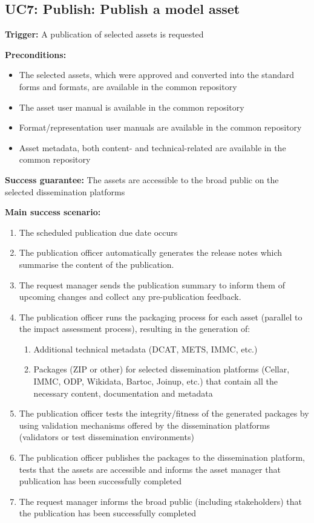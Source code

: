 	\subsection{UC7: Publish: Publish a model asset}
	\label{sec:uc7}
		
	\textbf{Trigger:} A publication of selected assets is requested
	
	\textbf{Preconditions:} 
	\begin{itemize}
		\item The selected assets, which were approved and converted into the standard forms and formats, are available in the common repository
		\item The asset user manual is available in the common repository
		\item Format/representation user manuals are available in the common repository
		\item Asset metadata, both content- and technical-related are available in the common repository
	\end{itemize}
	
	\textbf{Success guarantee:} The assets are accessible to the broad public on the selected dissemination platforms
	
	\textbf{Main success scenario:} 
	\begin{enumerate}
		\item The scheduled publication due date occurs
		\item The publication officer automatically generates the release notes which summarise the content of the publication.
		\item The request manager sends the publication summary to inform them of upcoming changes and collect any pre-publication feedback.
		\item The publication officer runs the packaging process for each asset (parallel to the impact assessment process), resulting in the generation of: 
		\begin{enumerate}
		\item Additional technical metadata (DCAT, METS, IMMC, etc.)
		\item Packages (ZIP or other) for selected dissemination platforms (Cellar, IMMC, ODP, Wikidata, Bartoc, Joinup, etc.) that contain all the necessary content, documentation and metadata
		\end{enumerate}
		\item The publication officer tests the integrity/fitness of the generated packages by using validation mechanisms offered by the dissemination platforms (validators or test dissemination environments)
		\item The publication officer publishes the packages to the dissemination platform, tests that the assets are accessible and informs the asset manager that publication has been successfully completed
		\item The request manager informs the broad public (including stakeholders) that the publication has been successfully completed
		
	\end{enumerate}
	
